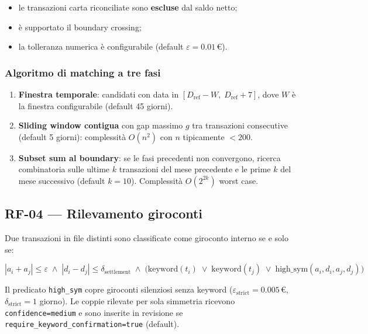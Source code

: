 \documentclass[11pt, a4paper]{article}
\begin{document}
\begin{itemize}[leftmargin=2em]
  \item le transazioni carta riconciliate sono \textbf{escluse} dal saldo netto;
  \item è supportato il boundary crossing;
  \item la tolleranza numerica è configurabile (default $\varepsilon = 0.01$\,\euro).
\end{itemize}

\subsubsection{Algoritmo di matching a tre fasi}

\begin{enumerate}[leftmargin=2em]
  \item \textbf{Finestra temporale}: candidati con data in
        $[D_{\text{ref}} - W,\; D_{\text{ref}} + 7]$, dove $W$ è la finestra configurabile
        (default 45 giorni).
  \item \textbf{Sliding window contigua} con gap massimo $g$ tra transazioni consecutive
        (default 5 giorni): complessità $O(n^2)$ con $n$ tipicamente $< 200$.
  \item \textbf{Subset sum al boundary}: se le fasi precedenti non convergono, ricerca
        combinatoria sulle ultime $k$ transazioni del mese precedente e le prime $k$ del
        mese successivo (default $k = 10$). Complessità $O(2^{2k})$ worst case.
\end{enumerate}

\subsection{RF-04 --- Rilevamento giroconti}

Due transazioni in file distinti sono classificate come giroconto interno se e solo se:

\[
  |a_i + a_j| \leq \varepsilon
  \;\wedge\;
  |d_i - d_j| \leq \delta_{\text{settlement}}
  \;\wedge\;
  \bigl(\text{keyword}(t_i) \;\vee\; \text{keyword}(t_j) \;\vee\; \text{high\_sym}(a_i, d_i, a_j, d_j)\bigr)
\]

Il predicato \texttt{high\_sym} copre giroconti silenziosi senza keyword
($\varepsilon_{\text{strict}} = 0.005$\,\euro, $\delta_{\text{strict}} = 1$ giorno).
Le coppie rilevate per sola simmetria ricevono \texttt{confidence=medium} e sono
inserite in revisione se \texttt{require\_keyword\_confirmation=true} (default).
\end{document}
